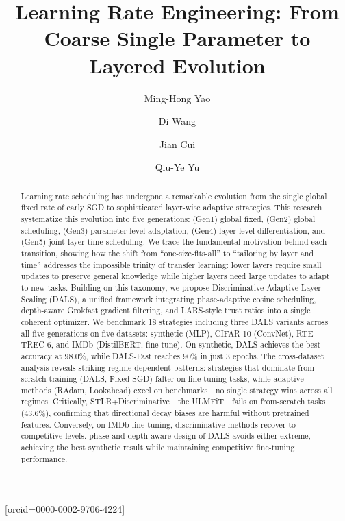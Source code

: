 \documentclass[a4paper,fleqn]{cas-dc}
\begin{document}
\let\WriteBookmarks\relax
\def\floatpagepagefraction{1}
\def\textpagefraction{.001}



\title [mode = title]{Learning Rate Engineering: From Coarse Single Parameter to Layered Evolution}

\author[1]{Ming-Hong Yao}
\author[1]{Di Wang}
\author[1]{Jian Cui}
\author[1]{Qiu-Ye Yu}[orcid=0000-0002-9706-4224]
\cormark[1]



\begin{abstract}
Learning rate scheduling has undergone a remarkable evolution from the single global fixed rate of early SGD to sophisticated layer-wise adaptive strategies. This research systematize this evolution into five generations: (Gen1) global fixed, (Gen2) global scheduling, (Gen3) parameter-level adaptation, (Gen4) layer-level differentiation, and (Gen5) joint layer-time scheduling. We trace the fundamental motivation behind each transition, showing how the shift from ``one-size-fits-all'' to ``tailoring by layer and time'' addresses the impossible trinity of transfer learning: lower layers require small updates to preserve general knowledge while higher layers need large updates to adapt to new tasks. Building on this taxonomy, we propose Discriminative Adaptive Layer Scaling (DALS), a unified framework integrating phase-adaptive cosine scheduling, depth-aware Grokfast gradient filtering, and LARS-style trust ratios into a single coherent optimizer. We benchmark 18 strategies including three DALS variants across all five generations on five datasets: synthetic (MLP), CIFAR-10 (ConvNet), RTE TREC-6, and IMDb (DistilBERT, fine-tune). On synthetic, DALS achieves the best accuracy at 98.0\%, while DALS-Fast reaches 90\% in just 3 epochs. The cross-dataset analysis reveals striking regime-dependent patterns: strategies that dominate from-scratch training (DALS, Fixed SGD) falter on fine-tuning tasks, while adaptive methods (RAdam, Lookahead) excel on benchmarks---no single strategy wins across all regimes. Critically, STLR+Discriminative---the ULMFiT---fails on from-scratch tasks (43.6\%), confirming that directional decay biases are harmful without pretrained features. Conversely, on IMDb fine-tuning, discriminative methods recover to competitive levels. phase-and-depth aware design of DALS avoids either extreme, achieving the best synthetic result while maintaining competitive fine-tuning performance.
\end{abstract}
\end{document}
